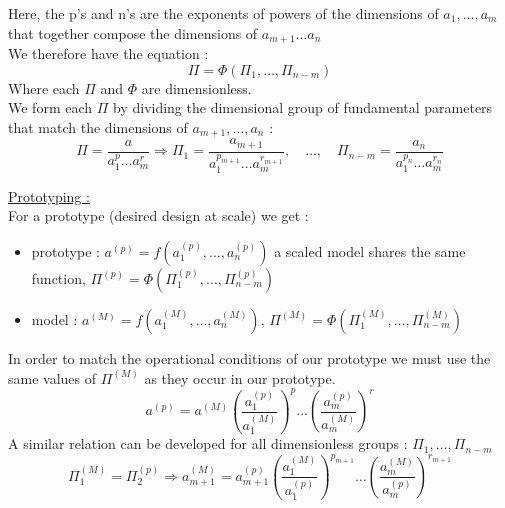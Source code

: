 \documentclass[../main.tex]{subfiles}
\begin{document}
Here, the p's and n's are the exponents of powers of the dimensions of $a_1,\dots, a_m$ that together compose the dimensions of $a_{m+1}\dots a_n$\\

We therefore have the equation : \begin{equation}
    \Pi = \Phi(\Pi_1, \dots, \Pi_{n-m})
\end{equation}
Where each $\Pi$ and $\Phi$ are dimensionless.\\

We form each $\Pi$ by dividing the dimensional group of fundamental parameters that match the dimensions of $a_{m+1},\dots, a_n$ : \begin{equation}
    \Pi = \frac{a}{a_1^p\dots a_m^r} \Rightarrow \Pi_1 = \frac{a_{m+1}}{a_1^{p_{m+1}} \dots a_m^{r_{m+1}}},\quad  \dots , \quad \Pi_{n-m} = \frac{a_{n}}{a_1^{p_{n}} \dots a_m^{r_{n}}}
\end{equation}

\quad \underline{Prototyping :}\\
For a prototype (desired design at scale) we get : \begin{itemize}
    \item prototype : $a^{(p)} = f(a_1^{(p)},\dots, a_n^{(p)})$ a scaled model shares the same function, $\Pi^{(p)} = \Phi(\Pi_1^{(p)}, \dots, \Pi_{n-m}^{(p)})$\\
    \item model : $a^{(M)} = f(a_1^{(M)},\dots, a_n^{(M)})$, $\Pi^{(M)} = \Phi(\Pi_1^{(M)}, \dots, \Pi_{n-m}^{(M)})$\\
\end{itemize}

In order to match the operational conditions of our prototype we must use the same values of $\Pi^{(M)}$ as they occur in our prototype.\\

\begin{equation}
    a^{(p)} = a^{(M)} (\frac{a_1^{(p)}}{a_1^{(M)}})^p \dots (\frac{a_m^{(p)}}{a_m^{(M)}})^r
\end{equation}
A similar relation can be developed for all dimensionless groups : $\Pi_1,\dots, \Pi_{n-m}$\\
\begin{equation}
    \Pi_1^{(M)} = \Pi_2^{(p)} \Rightarrow a_{m+1}^{(M)} = a_{m+1}^{(p)} (\frac{a_1^{(M)}}{a_1^{(p)}})^{p_{m+1}} \dots (\frac{a_m^{(M)}}{a_m^{(p)}})^{r_{m+1}}
\end{equation}
\end{document}
